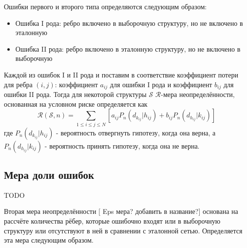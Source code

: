Ошибки первого и второго типа определяются следующим образом:

\begin{itemize}
	\item Ошибка I рода: ребро включено в выборочную структуру, но не включено в эталонную
	\item Ошибка II рода: ребро включено в эталонную структуру, но не включено в выборочную
\end{itemize}

Каждой из ошибок I и II рода и поставим в соответствие коэффициент потери для ребра $(i,j)$: коэффициент $a_{i j}$ для ошибки I рода и коэффициент $b_{i j}$ для ошибки II рода. Тогда для некоторой структуры $\mathcal{S}$ $\mathcal{R}$-мера неопределённости, основанная на условном риске определяется как
\begin{equation}
\mathcal{R}(\mathcal{S},n)=\sum_{1\leq i \leq j \leq N} {\left[
a_{i j}P_n(d_{k_{i j}} | h_{i j}) + b_{i j}P_n(d_{h_{i j}} | k_{i j})
\right]}
\end{equation}
где $P_n(d_{k_{i j}} | h_{i j})$ - вероятность отвергнуть гипотезу, когда она верна, а $P_n(d_{h_{i j}} | k_{i j})$ - вероятность принять гипотезу, когда она не верна.

\subsection{Мера доли ошибок}

TODO

Вторая мера неопределённости [ Eps мера? добавить в название?] основана на рассчёте количества рёбер, которые ошибочно входят или в выборочную структуру или отсутствуют в ней в сравнении с эталонной сетью.
Определяется эта мера следующим образом.

